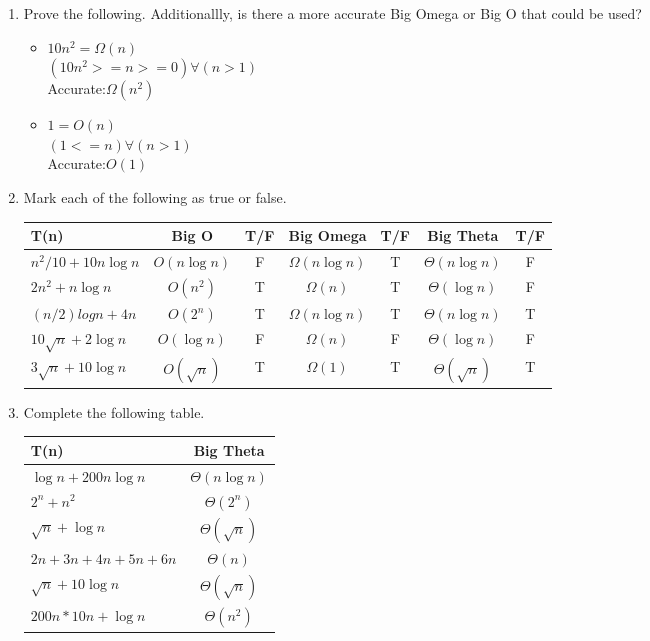 \documentclass[11pt]{article}
\begin{document}
\begin{enumerate}[leftmargin=*]

\item Prove the following. Additionallly, is there a more accurate Big Omega or Big O that could be used?
\begin{itemize}
    \item $10n^2 = \Omega(n)$\\
    $(10n^2 >= n >= 0)\forall (n > 1)$\\
    Accurate:$\Omega(n^2)$
    \item $1 = O(n)$\\
    $(1 <= n)\forall (n > 1)$\\
    Accurate:$O(1)$
\end{itemize}

\item Mark each of the following as true or false.
    \begin{center}
        \begin{tabular}{l | c | c | c | c | c | c}
            T(n) & Big O & T/F & Big Omega & T/F & Big Theta & T/F \\ \hline
            $ n^2/10 + 10 n \log n$ & $O(n \log n)$ & F & $\Omega(n \log n)$ & T & $\Theta(n \log n)$ & F\\ \hline
            $ 2n^2 + n \log n$ & $O(n^2)$ & T & $\Omega(n)$ & T & $\Theta(\log n)$ & F\\ \hline
            $(n/2) log n + 4n$ & $O(2^n)$ & T & $\Omega(n \log n)$ & T & $\Theta(n \log n)$ & T\\ \hline
            $10 \sqrt{n} + 2\log n$ & $O(\log n)$ & F & $\Omega(n)$ & F & $\Theta(\log n)$ & F\\ \hline
            $3\sqrt{n} + 10 \log n$ & $O(\sqrt n)$ & T & $\Omega(1)$ & T & $\Theta(\sqrt n)$ & T\\ \hline
        \end{tabular}
    \end{center}
    \item Complete the following table.
    \begin{center}
        \begin{tabular}{l | c }
            T(n) & Big Theta \\ \hline
            $\log n + 200 n \log n$ & $\Theta(n \log n)$\\ \hline
            $2^n + n^2$ & $\Theta(2^n)$ \\ \hline
            $\sqrt n + \log n$ & $\Theta(\sqrt n)$ \\ \hline
            $2n + 3n + 4n + 5n + 6n$ & $\Theta(n)$ \\ \hline
            $\sqrt{n} + 10 \log n$ & $\Theta(\sqrt n)$ \\ \hline
            $200 n * 10 n + \log n$ & $\Theta(n^2)$ \\ \hline
        \end{tabular}
    \end{center}
    

\end{enumerate}
\end{document}
